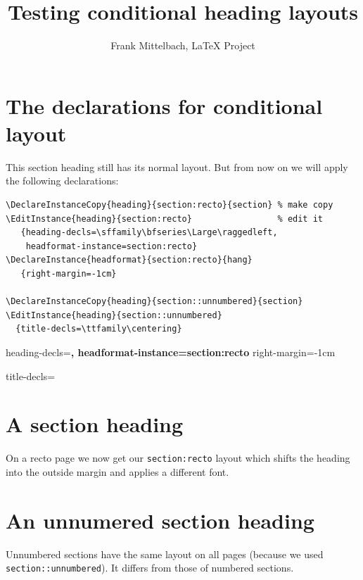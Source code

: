 \documentclass[a4paper,twoside]{article}
\begin{document}
\title{Testing conditional heading layouts}
\author{Frank Mittelbach, \LaTeX{} Project}
\maketitle

\section{The declarations for conditional layout}

This section heading still has its normal layout.
But from now on we will apply the following declarations:
\begin{verbatim}
\DeclareInstanceCopy{heading}{section:recto}{section} % make copy
\EditInstance{heading}{section:recto}                 % edit it
   {heading-decls=\sffamily\bfseries\Large\raggedleft,
    headformat-instance=section:recto}
\DeclareInstance{headformat}{section:recto}{hang}
   {right-margin=-1cm}

\DeclareInstanceCopy{heading}{section::unnumbered}{section}
\EditInstance{heading}{section::unnumbered}
  {title-decls=\ttfamily\centering}
\end{verbatim}

   {heading-decls=\sffamily\bfseries\Large\raggedleft,
    headformat-instance=section:recto}
   {right-margin=-1cm}

  {title-decls=\ttfamily\centering}


\section{A section heading}             

On a recto page we now get our \texttt{section:recto} layout which
shifts the heading into the outside margin and applies a different
font.

\kant[1][1-2]

\section*{An unnumered section heading} 

Unnumbered sections have the same layout on all pages (because we
used \texttt{section::unnumbered}). It differs from those of numbered
sections.
\end{document}
